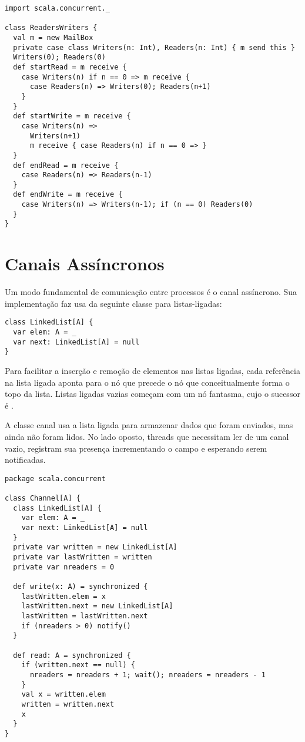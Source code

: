 \begin{lstlisting}
import scala.concurrent._

class ReadersWriters {
  val m = new MailBox
  private case class Writers(n: Int), Readers(n: Int) { m send this }
  Writers(0); Readers(0)
  def startRead = m receive {
    case Writers(n) if n == 0 => m receive {
      case Readers(n) => Writers(0); Readers(n+1)
    }
  }
  def startWrite = m receive {
    case Writers(n) =>
      Writers(n+1)
      m receive { case Readers(n) if n == 0 => }
  }
  def endRead = m receive {
    case Readers(n) => Readers(n-1)
  }
  def endWrite = m receive {
    case Writers(n) => Writers(n-1); if (n == 0) Readers(0)
  }
}
\end{lstlisting}

\section{Canais Assíncronos}

Um modo fundamental de comunicação entre processos é o canal assíncrono.
Sua implementação faz usa da seguinte classe para listas-ligadas:
\begin{lstlisting}
class LinkedList[A] {
  var elem: A = _
  var next: LinkedList[A] = null
}
\end{lstlisting}
Para facilitar a inserção e remoção de elementos nas listas ligadas,
cada referência na lista ligada aponta para o nó que precede o nó que conceitualmente forma o topo da lista.
Listas ligadas vazias começam com um nó fantasma, cujo o sucessor é 
.

A classe canal usa a lista ligada para armazenar dados que foram enviados, mas ainda não foram lidos. No lado oposto, threads que 
necessitam ler de um canal vazio, registram sua presença incrementando
o campo   e esperando serem notificadas.
\begin{lstlisting}
package scala.concurrent

class Channel[A] {
  class LinkedList[A] {
    var elem: A = _
    var next: LinkedList[A] = null
  }
  private var written = new LinkedList[A]
  private var lastWritten = written
  private var nreaders = 0

  def write(x: A) = synchronized {
    lastWritten.elem = x
    lastWritten.next = new LinkedList[A]
    lastWritten = lastWritten.next
    if (nreaders > 0) notify()
  }

  def read: A = synchronized {
    if (written.next == null) {
      nreaders = nreaders + 1; wait(); nreaders = nreaders - 1
    }
    val x = written.elem
    written = written.next
    x
  }
}
\end{lstlisting}

